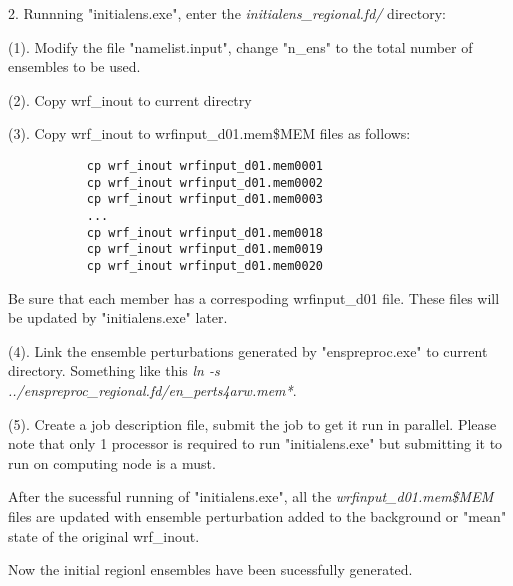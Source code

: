 2. Runnning  "initialens.exe", enter the \textit{initialens\_regional.fd/} directory:

(1). Modify the file "namelist.input", change "n\_ens" to the total number of ensembles to be used.

(2). Copy wrf\_inout to current directry

(3). Copy wrf\_inout to wrfinput\_d01.mem\$MEM files as follows:
\begin{scriptsize}
\begin{verbatim}
           cp wrf_inout wrfinput_d01.mem0001
           cp wrf_inout wrfinput_d01.mem0002
           cp wrf_inout wrfinput_d01.mem0003
           ...
           cp wrf_inout wrfinput_d01.mem0018
           cp wrf_inout wrfinput_d01.mem0019
           cp wrf_inout wrfinput_d01.mem0020
\end{verbatim}
\end{scriptsize}

 Be sure that each member has a correspoding wrfinput\_d01 file. These files will be updated by "initialens.exe" later. 

(4). Link the ensemble perturbations generated by "enspreproc.exe" to current directory. Something like this \textit{ln -s ../enspreproc\_regional.fd/en\_perts4arw.mem*}. 

(5). Create a job description file, submit the job to get it run in parallel. Please note that only 1 processor is required to run "initialens.exe" but submitting it to run on computing node is a must.

After the sucessful running of "initialens.exe", all the \textit{wrfinput\_d01.mem\$MEM} files are updated with ensemble perturbation added to the background or "mean" state of the original wrf\_inout.

Now the initial regionl ensembles have been sucessfully generated.



